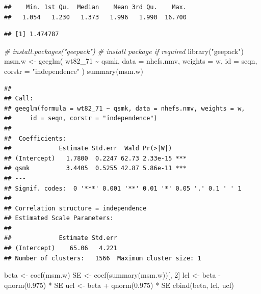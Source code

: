 \documentclass[
  10pt,
]{book}
\newenvironment{Shaded}{\begin{snugshade}}{\end{snugshade}}
\newcommand{\AttributeTok}[1]{\textcolor[rgb]{0.77,0.63,0.00}{#1}}
\newcommand{\CommentTok}[1]{\textcolor[rgb]{0.56,0.35,0.01}{\textit{#1}}}
\newcommand{\DecValTok}[1]{\textcolor[rgb]{0.00,0.00,0.81}{#1}}
\newcommand{\FloatTok}[1]{\textcolor[rgb]{0.00,0.00,0.81}{#1}}
\newcommand{\FunctionTok}[1]{\textcolor[rgb]{0.00,0.00,0.00}{#1}}
\newcommand{\NormalTok}[1]{#1}
\newcommand{\OtherTok}[1]{\textcolor[rgb]{0.56,0.35,0.01}{#1}}
\newcommand{\SpecialCharTok}[1]{\textcolor[rgb]{0.00,0.00,0.00}{#1}}
\newcommand{\StringTok}[1]{\textcolor[rgb]{0.31,0.60,0.02}{#1}}
\begin{document}
\begin{verbatim}
##    Min. 1st Qu.  Median    Mean 3rd Qu.    Max. 
##   1.054   1.230   1.373   1.996   1.990  16.700
\end{verbatim}

\begin{Shaded}
\end{Shaded}

\begin{verbatim}
## [1] 1.474787
\end{verbatim}

\begin{Shaded}
\begin{Highlighting}[]
\CommentTok{\# install.packages("geepack") \# install package if required}
\FunctionTok{library}\NormalTok{(}\StringTok{"geepack"}\NormalTok{)}
\NormalTok{msm.w }\OtherTok{\textless{}{-}} \FunctionTok{geeglm}\NormalTok{(}
\NormalTok{  wt82\_71 }\SpecialCharTok{\textasciitilde{}}\NormalTok{ qsmk,}
  \AttributeTok{data =}\NormalTok{ nhefs.nmv,}
  \AttributeTok{weights =}\NormalTok{ w,}
  \AttributeTok{id =}\NormalTok{ seqn,}
  \AttributeTok{corstr =} \StringTok{"independence"}
\NormalTok{)}
\FunctionTok{summary}\NormalTok{(msm.w)}
\end{Highlighting}
\end{Shaded}

\begin{verbatim}
## 
## Call:
## geeglm(formula = wt82_71 ~ qsmk, data = nhefs.nmv, weights = w, 
##     id = seqn, corstr = "independence")
## 
##  Coefficients:
##             Estimate Std.err  Wald Pr(>|W|)    
## (Intercept)   1.7800  0.2247 62.73 2.33e-15 ***
## qsmk          3.4405  0.5255 42.87 5.86e-11 ***
## ---
## Signif. codes:  0 '***' 0.001 '**' 0.01 '*' 0.05 '.' 0.1 ' ' 1
## 
## Correlation structure = independence 
## Estimated Scale Parameters:
## 
##             Estimate Std.err
## (Intercept)    65.06   4.221
## Number of clusters:   1566  Maximum cluster size: 1
\end{verbatim}

\begin{Shaded}
\begin{Highlighting}[]
\NormalTok{beta }\OtherTok{\textless{}{-}} \FunctionTok{coef}\NormalTok{(msm.w)}
\NormalTok{SE }\OtherTok{\textless{}{-}} \FunctionTok{coef}\NormalTok{(}\FunctionTok{summary}\NormalTok{(msm.w))[, }\DecValTok{2}\NormalTok{]}
\NormalTok{lcl }\OtherTok{\textless{}{-}}\NormalTok{ beta }\SpecialCharTok{{-}} \FunctionTok{qnorm}\NormalTok{(}\FloatTok{0.975}\NormalTok{) }\SpecialCharTok{*}\NormalTok{ SE}
\NormalTok{ucl }\OtherTok{\textless{}{-}}\NormalTok{ beta }\SpecialCharTok{+} \FunctionTok{qnorm}\NormalTok{(}\FloatTok{0.975}\NormalTok{) }\SpecialCharTok{*}\NormalTok{ SE}
\FunctionTok{cbind}\NormalTok{(beta, lcl, ucl)}
\end{Highlighting}
\end{Shaded}
\end{document}
